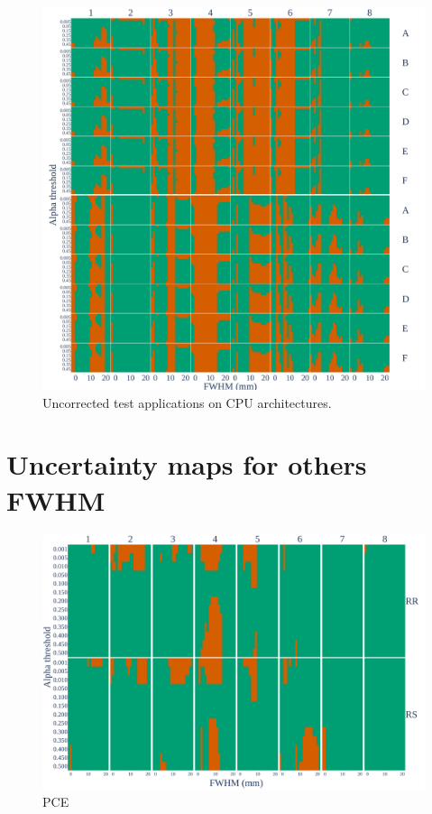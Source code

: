 \documentclass[lettersize,journal]{IEEEtran}
\begin{document}
\begin{figure}
    \centering
    \includegraphics[width=\linewidth]{figures/arch/arch_pce.pdf}
    \caption{Uncorrected test applications on CPU architectures.}
    \label{fig:arch_pce}
\end{figure}


\section{Uncertainty maps for others FWHM}

\begin{figure}
    \centering
    \includegraphics[width=\linewidth]{figures/loo_pce.pdf}
    \caption{PCE}
    \label{fig:loo_pce}
\end{figure}
\end{document}
